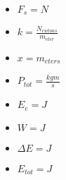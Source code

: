 \begin{adjustwidth}{1cm}{0pt}
    \begin{minipage}{0.33\textwidth}
        \begin{itemize}
            \item $F_{s} = N$
            \item $k = \frac{N_{ewtons}}{m_{eter}}$
            \item $x = m_{eters}$
            \item $P_{tot} = \frac{kgm}{s}$
        \end{itemize}
    \end{minipage}
    \begin{minipage}{0.33\textwidth}
        \begin{itemize}
            \item $E_{e} = J$
            \item $W = J$
            \item $\Delta E = J$
            \item $E_{tot} = J$
        \end{itemize}
    \end{minipage}
\end{adjustwidth}